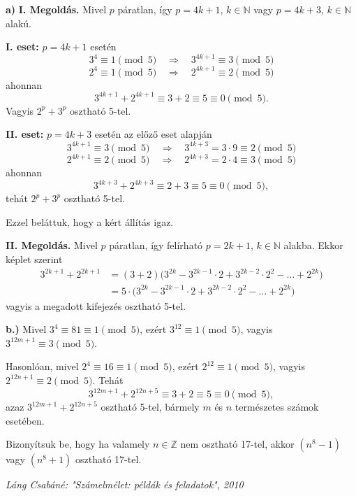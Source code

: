 \begin{solution}
	\textbf{a)} \textbf{I. Megoldás.} Mivel $p$ páratlan, így $p=4k+1$,
	$k\in\mathbb{N}$ vagy $p=4k+3$, $k\in\mathbb{N}$ alakú.
	
	\medskip{}
	
	\noindent\textbf{I. eset:} $p=4k+1$ esetén 
	\[
	3^{4}\equiv1\pmod 5\quad\Rightarrow\quad3^{4k+1}\equiv3\pmod 5
	\]
	\[
	2^{4}\equiv1\pmod 5\quad\Rightarrow\quad2^{4k+1}\equiv2\pmod 5
	\]
	ahonnan 
	\[
	3^{4k+1}+2^{4k+1}\equiv3+2\equiv5\equiv0\pmod 5.
	\]
	Vagyis $2^{p}+3^{p}$ osztható 5-tel.
	
	\medskip{}
	
	\noindent\textbf{II. eset:} $p=4k+3$ esetén az előző eset alapján
	\[
	3^{4k+1}\equiv3\pmod 5\quad\Rightarrow\quad3^{4k+3}=3\cdot9\equiv2\pmod 5
	\]
	\[
	2^{4k+1}\equiv2\pmod 5\quad\Rightarrow\quad2^{4k+3}=2\cdot4\equiv3\pmod 5
	\]
	ahonnan 
	\[
	3^{4k+3}+2^{4k+3}\equiv2+3\equiv5\equiv0\pmod 5,
	\]
	tehát $2^{p}+3^{p}$ osztható 5-tel.
	
	\medskip{}
	
	\noindent Ezzel beláttuk, hogy a kért állítás igaz.
	
	\bigskip{}
	
	\noindent\textbf{II. Megoldás.} Mivel $p$ páratlan, így felírható
	$p=2k+1$, $k\in\mathbb{N}$ alakba. Ekkor képlet szerint 
	\begin{align*}
		3^{2k+1}+2^{2k+1} & =(3+2)\bigl(3^{2k}-3^{2k-1}\cdot2+3^{2k-2}\cdot2^{2}-\ldots+2^{2k}\bigr)\\
		& =5\cdot\bigl(3^{2k}-3^{2k-1}\cdot2+3^{2k-2}\cdot2^{2}-\ldots+2^{2k}\bigr)
	\end{align*}
	vagyis a megadott kifejezés osztható 5-tel.
	
	\bigskip{}
	
	\noindent\textbf{b.)} Mivel $3^{4}\equiv81\equiv1\pmod 5$, ezért
	$3^{12}\equiv1\pmod 5$, vagyis $3^{12m+1}\equiv3\pmod 5$.
	
	\smallskip{}
	
	\noindent Hasonlóan, mivel $2^{4}\equiv16\equiv1\pmod 5$, ezért $2^{12}\equiv1\pmod 5$,
	vagyis $2^{12n+1}\equiv2\pmod 5$. Tehát 
	\[
	3^{12m+1}+2^{12n+5}\equiv3+2\equiv5\equiv0\pmod 5,
	\]
	azaz $3^{12m+1}+2^{12n+5}$ osztható 5-tel, bármely $m$ és $n$ természetes
	számok esetében. 
\end{solution}
\begin{extraproblem}
	Bizonyítsuk be, hogy ha valamely $n\in\mathbb{Z}$ nem osztható 17-tel,
	akkor $(n^{8}-1)$ vagy $(n^{8}+1)$ osztható 17-tel.
	\begin{flushright}
		\textit{Láng Csabáné: "Számelmélet: példák és feladatok", 2010} 
		\par\end{flushright}
\end{extraproblem}

